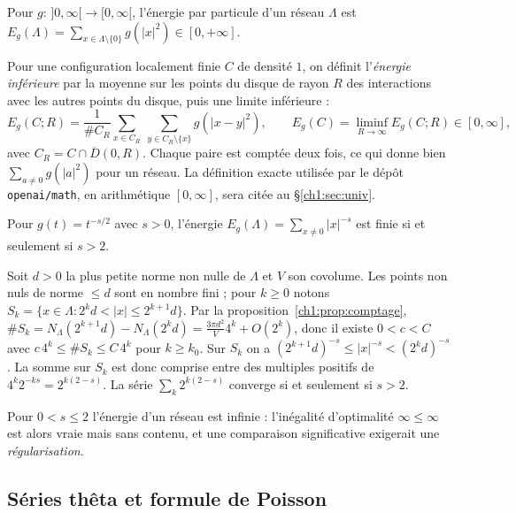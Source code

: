 \begin{definition}\label{ch1:def:enerreseau}
Pour $g:\,]0,\infty[\to[0,\infty[$, l'énergie par particule d'un réseau $\Lambda$ est
$E_g(\Lambda)=\sum_{x\in\Lambda\setminus\{0\}} g(|x|^2)\in[0,+\infty]$.
\end{definition}

Pour une configuration localement finie $C$ de densité $1$, on définit l'\emph{énergie inférieure} par la moyenne sur les points
du disque de rayon $R$ des interactions avec les autres points du disque, puis une limite inférieure :
\[
  E_g(C;R)=\frac{1}{\#C_R}\sum_{x\in C_R}\ \sum_{y\in C_R\setminus\{x\}} g(|x-y|^2),\qquad E_g(C)=\liminf_{R\to\infty}E_g(C;R)\in[0,\infty],
\]
avec $C_R=C\cap\overline D(0,R)$. Chaque paire est comptée deux fois, ce qui donne bien $\sum_{a\neq0}g(|a|^2)$ pour un réseau.
\tierC{} La définition exacte utilisée par le dépôt \texttt{openai/math}, en arithmétique $[0,\infty]$, sera citée au §\ref{ch1:sec:univ}.

\begin{proposition}\label{ch1:prop:riesz}
Pour $g(t)=t^{-s/2}$ avec $s>0$, l'énergie $E_g(\Lambda)=\sum_{x\ne0}|x|^{-s}$ est finie si et seulement si $s>2$. \tierC{}
\end{proposition}

\begin{humanproof}
Soit $d>0$ la plus petite norme non nulle de $\Lambda$ et $V$ son covolume. Les points non nuls de norme $\le d$ sont en nombre fini ;
pour $k\ge0$ notons $S_k=\{x\in\Lambda : 2^kd<|x|\le 2^{k+1}d\}$. Par la proposition~\ref{ch1:prop:comptage},
$\#S_k=N_\Lambda(2^{k+1}d)-N_\Lambda(2^kd)=\frac{3\pi d^2}{V}4^k+O(2^k)$, donc il existe $0<c<C$ avec $c\,4^k\le\#S_k\le C\,4^k$ pour $k\ge k_0$.
Sur $S_k$ on a $(2^{k+1}d)^{-s}\le |x|^{-s}<(2^kd)^{-s}$. La somme sur $S_k$ est donc comprise entre des multiples positifs de $4^k2^{-ks}=2^{k(2-s)}$.
La série $\sum_k 2^{k(2-s)}$ converge si et seulement si $s>2$.
\end{humanproof}

\begin{remark}
Pour $0<s\le2$ l'énergie d'un réseau est infinie : l'inégalité d'optimalité $\infty\le\infty$ est alors vraie mais sans contenu, et une comparaison
significative exigerait une \emph{régularisation}. \tierC{}
\end{remark}

\subsection{Séries thêta et formule de Poisson}
\label{ch1:sec:poisson}

